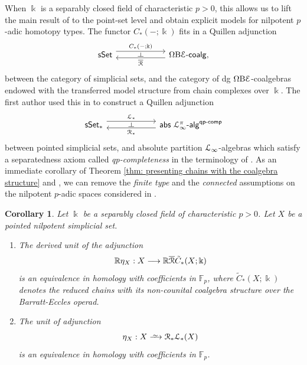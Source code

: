 \documentclass{proc-l}
\renewcommand{\mathcal}{\EuScript}
\theoremstyle{plain}
\newtheorem{corollary}[{theorem}]{Corollary}
\theoremstyle{definition}
\theoremstyle{remark}
\newcommand{\qi}{\xrightarrow{ \,\smash{\raisebox{-0.65ex}{\ensuremath{\scriptstyle\sim}}}\,}}
\newcommand{\kk}{\Bbbk}
\begin{document}
When $\kk$ is a separably closed field of characteristic $p > 0$, this allows us to lift the main result of \cite{bachmann2024} to the point-set level and obtain explicit models for nilpotent $p$-adic homotopy types. The functor $C_*(-;\kk)$ fits in a Quillen adjunction
\[
\begin{tikzcd}[column sep=5pc,row sep=3pc]
\mathsf{sSet} \arrow[r, shift left=1.1ex, "C_*(-;\kk)"{name=F}] &\Omega \mathrm{B} \mathcal{E}\text{-}\mathsf{coalg}, \arrow[l, shift left=.75ex, "\overline{\mathcal{R}}"{name=U}]
\arrow[phantom, from=F, to=U, , "\dashv" rotate=-90]
\end{tikzcd}
\]
between the category of simplicial sets, and the category of dg $\Omega\mathrm{B}\mathcal{E}$-coalgebras endowed with the transferred model structure from chain complexes over $\kk$. The first author used this in \cite{lucio2024higherlietheorypositive} to construct a Quillen adjunction
\[
\begin{tikzcd}[column sep=5pc,row sep=3pc]
\mathsf{sSet}_* \arrow[r, shift left=1.1ex, "\mathcal{L}_*"{name=A}]
&\mathsf{abs}~\mathcal{L}_\infty^\pi\text{-}\mathsf{alg}^{\mathsf{qp}\text{-}\mathsf{comp}} \arrow[l, shift left=.75ex, "\mathcal{R}_*"{name=B}]
\arrow[phantom, from=A, to=B, , "\dashv" rotate=-90]
\end{tikzcd}
\]
between pointed simplicial sets, and absolute partition $\mathcal{L}_\infty$-algebras which satisfy a separatedness axiom called \textit{qp-completeness} in the terminology of \cite{premierpapier}. As an immediate corollary of Theorem \ref{thm: presenting chains with the coalgebra structure} and \cite[Theorem 1.2]{bachmann2024}, we can remove the \textit{finite type} and the \textit{connected} assumptions on the nilpotent $p$-adic spaces considered in \cite{lucio2024higherlietheorypositive}.

\begin{corollary}%
\label{Corollary:1.15}Let $\kk$ be a separably closed field of characteristic $p > 0$. Let $X$ be a pointed nilpotent simplicial set.
\begin{enumerate}[label=(\arabic*),start=1]
\item The derived unit of the adjunction
\[
\mathbb{R}\eta_X: X \longrightarrow \mathbb{R}\overline{\mathcal{R}}\tilde{C}_*(X;\kk)
\]
is an equivalence in homology with coefficients in $\mathbb{F}_p$, where $\tilde{C}_*(X;\kk)$ denotes the \textit{reduced} chains with its non-counital coalgebra structure over the Barratt-Eccles operad.
\item The unit of adjunction
\[
\eta_X: X \qi \mathcal{R}_*\mathcal{L}_*(X)
\]
is an equivalence in homology with coefficients in $\mathbb{F}_p$.
\end{enumerate}
\end{corollary}
\end{document}
